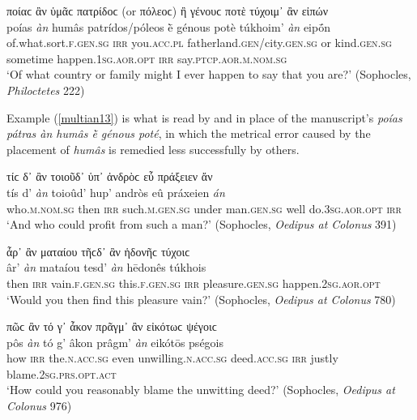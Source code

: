 \begin{exe}
\ex ποίαϲ ἂν ὑμᾶϲ πατρίδοϲ (or πόλεοϲ) ἢ γένουϲ ποτὲ τύχοιμ᾽ ἂν εἰπών\\
\gll poías \emph{àn} humâs patrídos/póleos ḕ génous potè túkhoim' \emph{àn} eipṓn\\
of.what.sort.\textsc{f.gen.sg} \textsc{irr} you.\textsc{acc.pl} fatherland.\textsc{gen}/city.\textsc{gen.sg} or kind.\textsc{gen.sg} sometime happen.\textsc{1sg.aor.opt} \textsc{irr} say.\textsc{ptcp.aor.m.nom.sg}\\
\trans `Of what country or family might I ever happen to say that you are?' (Sophocles, \textit{Philoctetes} 222)
\label{multian13}
\end{exe}

Example (\ref{multian13}) is what is read by \citet[304]{Dindorf1882} and \citet[18--19]{Heimreich1884} in place of the manuscript's \textit{poías pátras àn humâs ḕ génous poté}, in which the metrical error caused by the placement of \emph{humâs} is remedied less successfully by others.

\begin{exe}
\ex τίϲ δ᾽ ἂν τοιοῦδ᾽ ὑπ᾽ ἀνδρὸϲ εὖ πράξειεν ἄν\\
\gll tís d' \emph{àn} toioûd' hup' andròs eû práxeien \emph{án}\\
who.\textsc{m.nom.sg} then \textsc{irr} such.\textsc{m.gen.sg} under man.\textsc{gen.sg} well do.\textsc{3sg.aor.opt} \textsc{irr}\\
\trans `And who could profit from such a man?' (Sophocles, \textit{Oedipus at Colonus} 391)
\label{multian14}
\end{exe}

\begin{exe}
\ex ἆρ᾽ ἂν ματαίου τῆϲδ᾽ ἂν ἡδονῆϲ τύχοιϲ\\
\gll âr' \emph{àn} mataíou tesd' \emph{àn} hēdonês túkhois\\
then \textsc{irr} vain.\textsc{f.gen.sg} this.\textsc{f.gen.sg} \textsc{irr} pleasure.\textsc{gen.sg} happen.\textsc{2sg.aor.opt}\\
\trans `Would you then find this pleasure vain?' (Sophocles, \textit{Oedipus at Colonus} 780)
\label{multian15}
\end{exe}

\begin{exe}
\ex πῶϲ ἂν τό γ᾽ ἆκον πρᾶγμ᾽ ἂν εἰκότωϲ ψέγοιϲ\\
\gll pôs \emph{àn} tó g' âkon prâgm' \emph{àn} eikótōs pségois\\
how \textsc{irr} the.\textsc{n.acc.sg} even unwilling.\textsc{n.acc.sg} deed.\textsc{acc.sg} \textsc{irr} justly blame.\textsc{2sg.prs.opt.act}\\
\trans `How could you reasonably blame the unwitting deed?' (Sophocles, \textit{Oedipus at Colonus} 976)
\label{multian16}
\end{exe}

